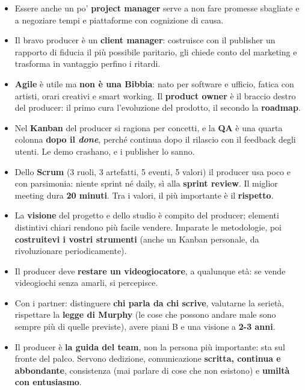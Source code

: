 \begin{itemize}
        sensibili. Il finanziamento è spesso negoziabile.
  \item Essere anche un po' \textbf{project manager} serve a non fare promesse
        sbagliate e a negoziare tempi e piattaforme con cognizione di causa.
  \item Il bravo producer è un \textbf{client manager}: costruisce con il
        publisher un rapporto di fiducia il più possibile paritario, gli chiede
        conto del marketing e trasforma in vantaggio perfino i ritardi.
  \item \textbf{Agile} è utile ma \textbf{non è una Bibbia}: nato per software e
        ufficio, fatica con artisti, orari creativi e smart working. Il
        \textbf{product owner} è il braccio destro del producer: il primo cura
        l'evoluzione del prodotto, il secondo la \textbf{roadmap}.
  \item Nel \textbf{Kanban} del producer si ragiona per concetti, e la
        \textbf{QA} è una quarta colonna \textbf{dopo il \emph{done}}, perché
        continua dopo il rilascio con il feedback degli utenti. Le demo
        crashano, e i publisher lo sanno.
  \item Dello \textbf{Scrum} (3 ruoli, 3 artefatti, 5 eventi, 5 valori) il
        producer usa poco e con parsimonia: niente sprint né daily, sì alla
        \textbf{sprint review}. Il miglior meeting dura \textbf{20 minuti}. Tra i
        valori, il più importante è il \textbf{rispetto}.
  \item La \textbf{visione} del progetto e dello studio è compito del producer;
        elementi distintivi chiari rendono più facile vendere. Imparate le
        metodologie, poi \textbf{costruitevi i vostri strumenti} (anche un Kanban
        personale, da rivoluzionare periodicamente).
  \item Il producer deve \textbf{restare un videogiocatore}, a qualunque età:
        se vende videogiochi senza amarli, si percepisce.
  \item Con i partner: distinguere \textbf{chi parla da chi scrive}, valutarne
        la serietà, rispettare la \textbf{legge di Murphy} (le cose che possono
        andare male sono sempre più di quelle previste), avere piani B e una
        visione a \textbf{2-3 anni}.
  \item Il producer è \textbf{la guida del team}, non la persona più importante:
        sta sul fronte del palco. Servono dedizione, comunicazione
        \textbf{scritta, continua e abbondante}, consistenza (mai parlare di cose
        che non esistono) e \textbf{umiltà con entusiasmo}.

\end{itemize}
